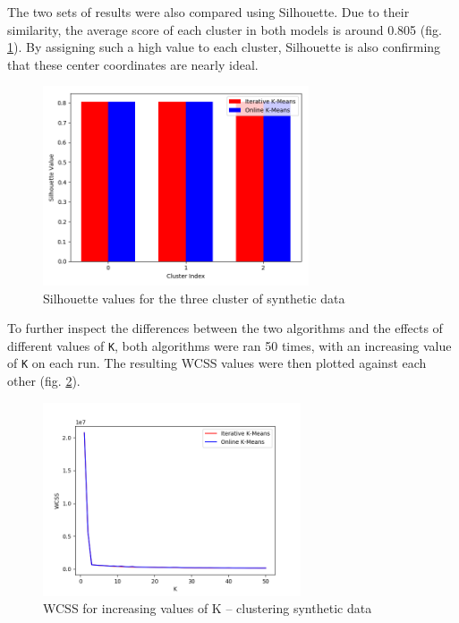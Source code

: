 \documentclass{l4proj}
\begin{document}
The two sets of results were also compared using Silhouette. Due to their similarity, the average score of each cluster in both models is around 0.805 (fig. \ref{fig:res18}). By assigning such a high value to each cluster, Silhouette is also confirming that these center coordinates are nearly ideal.

\begin{figure}[H]
	\centering
    \includegraphics[width=0.7\textwidth]{images/result18}
    \caption{Silhouette values for the three cluster of synthetic data} 
    \label{fig:res18}
\end{figure}

To further inspect the differences between the two algorithms and the effects of different values of \texttt{K}, both algorithms were ran 50 times, with an increasing value of \texttt{K} on each run. The resulting WCSS values were then plotted against each other (fig. \ref{fig:res1}).

\begin{figure}[H]
	\centering
    \includegraphics[width=0.68\textwidth]{images/result1}
    \caption{WCSS for increasing values of K -- clustering synthetic data} 
    \label{fig:res1}
\end{figure}
\end{document}
